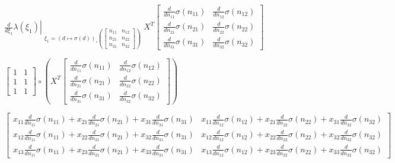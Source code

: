 \documentclass[11pt]{article}
\begin{document}
    
    $\displaystyle \left. \frac{d}{d \xi_{1}} \lambda{\left(\xi_{1} \right)} \right|_{\substack{ \xi_{1}={\left( d \mapsto \sigma{\left(d \right)} \right)}_{\circ}\left({\left[\begin{matrix}n_{11} & n_{12}\\n_{21} & n_{22}\\n_{31} & n_{32}\end{matrix}\right]}\right) }} X^{T} \left[\begin{matrix}\frac{d}{d n_{11}} \sigma{\left(n_{11} \right)} & \frac{d}{d n_{12}} \sigma{\left(n_{12} \right)}\\\frac{d}{d n_{21}} \sigma{\left(n_{21} \right)} & \frac{d}{d n_{22}} \sigma{\left(n_{22} \right)}\\\frac{d}{d n_{31}} \sigma{\left(n_{31} \right)} & \frac{d}{d n_{32}} \sigma{\left(n_{32} \right)}\end{matrix}\right]$

    
    $\displaystyle \left[\begin{matrix}1 & 1\\1 & 1\\1 & 1\end{matrix}\right] \circ \left(X^{T} \left[\begin{matrix}\frac{d}{d n_{11}} \sigma{\left(n_{11} \right)} & \frac{d}{d n_{12}} \sigma{\left(n_{12} \right)}\\\frac{d}{d n_{21}} \sigma{\left(n_{21} \right)} & \frac{d}{d n_{22}} \sigma{\left(n_{22} \right)}\\\frac{d}{d n_{31}} \sigma{\left(n_{31} \right)} & \frac{d}{d n_{32}} \sigma{\left(n_{32} \right)}\end{matrix}\right]\right)$

    
    $\displaystyle \left[\begin{matrix}x_{11} \frac{d}{d n_{11}} \sigma{\left(n_{11} \right)} + x_{21} \frac{d}{d n_{21}} \sigma{\left(n_{21} \right)} + x_{31} \frac{d}{d n_{31}} \sigma{\left(n_{31} \right)} & x_{11} \frac{d}{d n_{12}} \sigma{\left(n_{12} \right)} + x_{21} \frac{d}{d n_{22}} \sigma{\left(n_{22} \right)} + x_{31} \frac{d}{d n_{32}} \sigma{\left(n_{32} \right)}\\x_{12} \frac{d}{d n_{11}} \sigma{\left(n_{11} \right)} + x_{22} \frac{d}{d n_{21}} \sigma{\left(n_{21} \right)} + x_{32} \frac{d}{d n_{31}} \sigma{\left(n_{31} \right)} & x_{12} \frac{d}{d n_{12}} \sigma{\left(n_{12} \right)} + x_{22} \frac{d}{d n_{22}} \sigma{\left(n_{22} \right)} + x_{32} \frac{d}{d n_{32}} \sigma{\left(n_{32} \right)}\\x_{13} \frac{d}{d n_{11}} \sigma{\left(n_{11} \right)} + x_{23} \frac{d}{d n_{21}} \sigma{\left(n_{21} \right)} + x_{33} \frac{d}{d n_{31}} \sigma{\left(n_{31} \right)} & x_{13} \frac{d}{d n_{12}} \sigma{\left(n_{12} \right)} + x_{23} \frac{d}{d n_{22}} \sigma{\left(n_{22} \right)} + x_{33} \frac{d}{d n_{32}} \sigma{\left(n_{32} \right)}\end{matrix}\right]$
\end{document}
